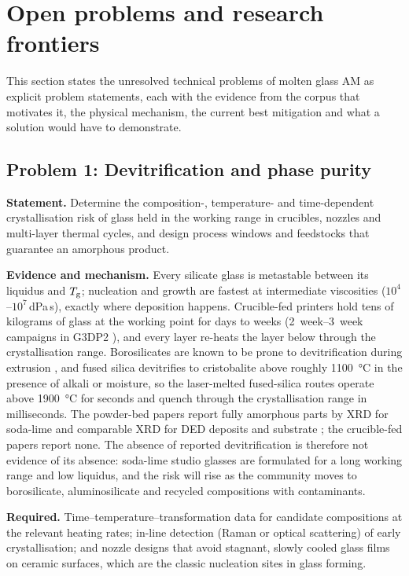 \section{Open problems and research frontiers}
\label{sec:open}

This section states the unresolved technical problems of molten glass AM as explicit problem statements, each with the evidence from the corpus that motivates it, the physical mechanism, the current best mitigation and what a solution would have to demonstrate.

\subsection{Problem 1: Devitrification and phase purity}
\textbf{Statement.} Determine the composition-, temperature- and time-dependent crystallisation risk of glass held in the working range in crucibles, nozzles and multi-layer thermal cycles, and design process windows and feedstocks that guarantee an amorphous product.

\textbf{Evidence and mechanism.} Every silicate glass is metastable between its liquidus and \(T_{\mathrm{g}}\); nucleation and growth are fastest at intermediate viscosities (\(10^{4}\)--\(10^{7}\)\,dPa\,s), exactly where deposition happens. Crucible-fed printers hold tens of kilograms of glass at the working point for days to weeks (\SIrange{2}{3}{week} campaigns in G3DP2 \citep{inamura2018}), and every layer re-heats the layer below through the crystallisation range. Borosilicates are known to be prone to devitrification during extrusion \citep{klein2015}, and fused silica devitrifies to cristobalite above roughly \SI{1100}{\celsius} in the presence of alkali or moisture, so the laser-melted fused-silica routes operate above \SI{1900}{\celsius} for seconds and quench through the crystallisation range in milliseconds. The powder-bed papers report fully amorphous parts by XRD for soda-lime \citep{datsiou2021} and comparable XRD for DED deposits and substrate \citep{spirrett2023}; the crucible-fed papers report none. The absence of reported devitrification is therefore not evidence of its absence: soda-lime studio glasses are formulated for a long working range and low liquidus, and the risk will rise as the community moves to borosilicate, aluminosilicate and recycled compositions with contaminants.

\textbf{Required.} Time--temperature--transformation data for candidate compositions at the relevant heating rates; in-line detection (Raman or optical scattering) of early crystallisation; and nozzle designs that avoid stagnant, slowly cooled glass films on ceramic surfaces, which are the classic nucleation sites in glass forming.

